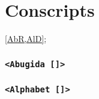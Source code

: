 \newpage
\part{Conscripts}
\cref{AbR,AlD};

\newpage
\section{\texttt{<Abugida~[\NameAbR]>}}


\newpage
\section{\texttt{<Alphabet [\NameAlD]>}}
